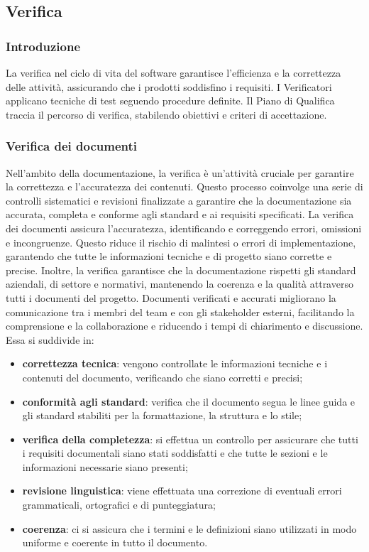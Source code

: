 \subsection{Verifica}
\subsubsection{Introduzione}
La verifica nel ciclo di vita del software garantisce l'efficienza e la correttezza delle attività, assicurando che i prodotti soddisfino i requisiti. I Verificatori applicano tecniche di test seguendo procedure definite. Il Piano di Qualifica traccia il percorso di verifica, stabilendo obiettivi e criteri di accettazione.

\subsubsection{Verifica dei documenti} \label{verifica_dei_documenti}
Nell'ambito della documentazione, la verifica è un'attività cruciale per garantire la correttezza e l'accuratezza dei contenuti. Questo processo coinvolge una serie di controlli sistematici e revisioni finalizzate a garantire che la documentazione sia accurata, completa e conforme agli standard e ai requisiti specificati.
La verifica dei documenti assicura l'accuratezza, identificando e correggendo errori, omissioni e incongruenze. Questo riduce il rischio di malintesi o errori di implementazione, garantendo che tutte le informazioni tecniche e di progetto siano corrette e precise.
Inoltre, la verifica garantisce che la documentazione rispetti gli standard aziendali, di settore e normativi, mantenendo la coerenza e la qualità attraverso tutti i documenti del progetto. Documenti verificati e accurati migliorano la comunicazione tra i membri del team e con gli stakeholder esterni, facilitando la comprensione e la collaborazione e riducendo i tempi di chiarimento e discussione. Essa si suddivide in:
\begin{itemize}
	\item \textbf{correttezza tecnica}: vengono controllate le informazioni tecniche e i contenuti del documento, verificando che siano corretti e precisi;
	\item \textbf{conformità agli standard}: verifica che il documento segua le linee guida e gli standard stabiliti per la formattazione, la struttura e lo stile;
	\item \textbf{verifica della completezza}: si effettua un controllo per assicurare che tutti i requisiti documentali siano stati soddisfatti e che  tutte le sezioni e le informazioni necessarie siano presenti;
	\item \textbf{revisione linguistica}: viene effettuata una correzione di eventuali errori grammaticali, ortografici e di punteggiatura;
	\item \textbf{coerenza}: ci si assicura che i termini e le definizioni siano utilizzati in modo uniforme e coerente in tutto il documento.
\end{itemize}

